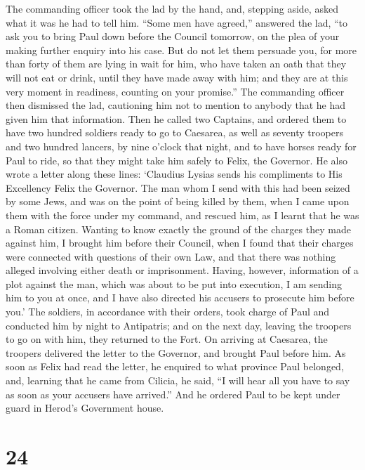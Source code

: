  The commanding officer took the lad by the hand, and,
stepping aside, asked what it was he had to tell him. 
``Some men have agreed,'' answered the lad, ``to ask you to bring Paul
down before the Council tomorrow, on the plea of your making further
enquiry into his case.  But do not let them persuade you,
for more than forty of them are lying in wait for him, who have taken an
oath that they will not eat or drink, until they have made away with
him; and they are at this very moment in readiness, counting on your
promise.''  The commanding officer then dismissed the lad,
cautioning him not to mention to anybody that he had given him that
information.  Then he called two Captains, and ordered them
to have two hundred soldiers ready to go to Caesarea, as well as seventy
troopers and two hundred lancers, by nine o'clock that night,
 and to have horses ready for Paul to ride, so that they
might take him safely to Felix, the Governor.  He also
wrote a letter along these lines:  `Claudius Lysias sends
his compliments to His Excellency Felix the Governor.  The
man whom I send with this had been seized by some Jews, and was on the
point of being killed by them, when I came upon them with the force
under my command, and rescued him, as I learnt that he was a Roman
citizen.  Wanting to know exactly the ground of the charges
they made against him, I brought him before their Council, 
when I found that their charges were connected with questions of their
own Law, and that there was nothing alleged involving either death or
imprisonment.  Having, however, information of a plot
against the man, which was about to be put into execution, I am sending
him to you at once, and I have also directed his accusers to prosecute
him before you.'  The soldiers, in accordance with their
orders, took charge of Paul and conducted him by night to Antipatris;
 and on the next day, leaving the troopers to go on with
him, they returned to the Fort.  On arriving at Caesarea,
the troopers delivered the letter to the Governor, and brought Paul
before him.  As soon as Felix had read the letter, he
enquired to what province Paul belonged, and, learning that he came from
Cilicia, he said,  ``I will hear all you have to say as
soon as your accusers have arrived.'' And he ordered Paul to be kept
under guard in Herod's Government house.

\hypertarget{section-23}{%
\section{24}\label{section-23}}


